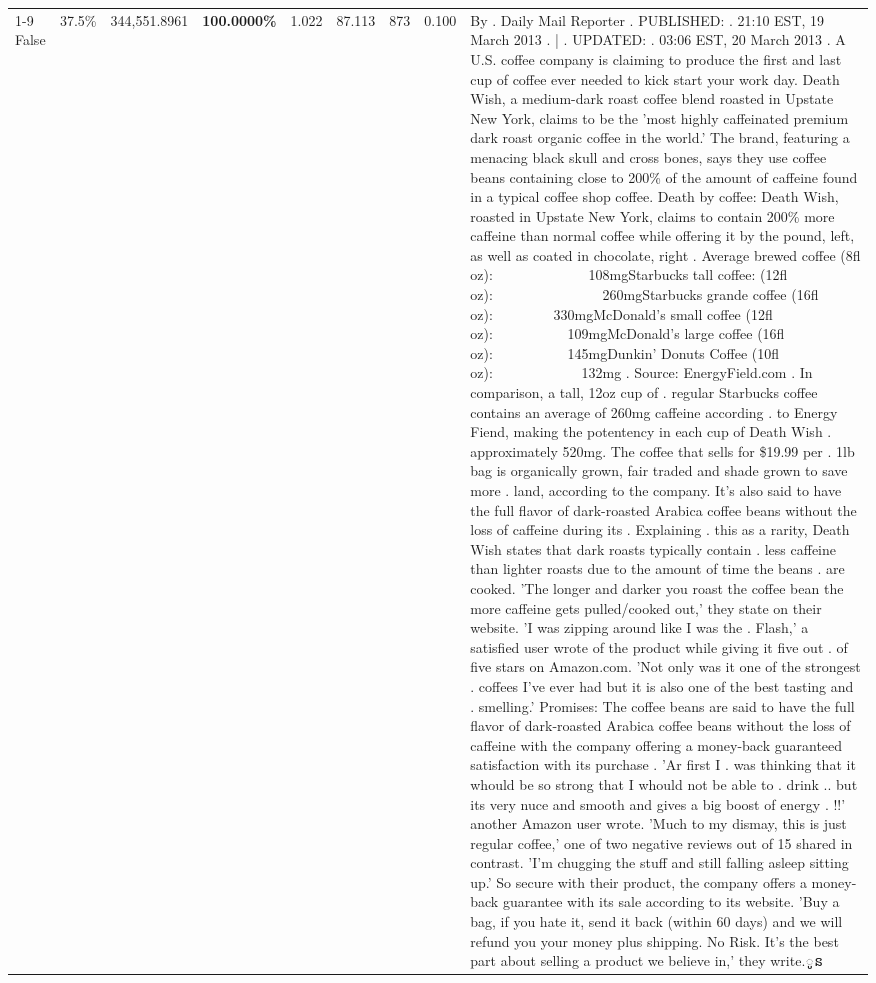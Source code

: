 \begin{table}[H]
{\begin{tabular}{lllrlllll}
\cline{1-9} \cline{2-9}
False & 37.5\% & 344,551.8961 & \bfseries \color{red} 100.0000\% & 1.022 & 87.113 & 873 & 0.100 & By . Daily Mail Reporter . PUBLISHED: . 21:10 EST, 19 March 2013 . | . UPDATED: . 03:06 EST, 20 March 2013 . A U.S. coffee company is claiming to produce the first and last cup of coffee ever needed to kick start your work day. Death Wish, a medium-dark roast coffee blend roasted in Upstate New York, claims to be the 'most highly caffeinated premium dark roast organic coffee in the world.' The brand, featuring a menacing black skull and cross bones, says they use coffee beans containing close to 200\% of the amount of caffeine found in a typical coffee shop coffee. Death by coffee: Death Wish, roasted in Upstate New York, claims to contain 200\% more caffeine than normal coffee while offering it by the pound, left, as well as coated in chocolate, right . Average brewed coffee (8fl oz):              108mgStarbucks tall coffee: (12fl oz):                260mgStarbucks grande coffee (16fl oz):         330mgMcDonald's small coffee (12fl oz):           109mgMcDonald's large coffee (16fl oz):           145mgDunkin' Donuts Coffee (10fl oz):             132mg . Source: EnergyField.com . In comparison, a tall, 12oz cup of . regular Starbucks coffee contains an average of 260mg caffeine according . to Energy Fiend, making the potentency in each cup of Death Wish . approximately 520mg. The coffee that sells for \$19.99 per . 1lb bag is organically grown, fair traded and shade grown to save more . land, according to the company. It's also said to have the full flavor of dark-roasted Arabica coffee beans without the loss of caffeine during its . Explaining . this as a rarity, Death Wish states that dark roasts typically contain . less caffeine than lighter roasts due to the amount of time the beans . are cooked. 'The longer and darker you roast the coffee bean the more caffeine gets pulled/cooked out,' they state on their website. 'I was zipping around like I was the . Flash,' a satisfied user wrote of the product while giving it five out . of five stars on Amazon.com. 'Not only was it one of the strongest . coffees I've ever had but it is also one of the best tasting and . smelling.’ Promises: The coffee beans are said to have the full flavor of dark-roasted Arabica coffee beans without the loss of caffeine with the company offering a money-back guaranteed satisfaction with its purchase . 'Ar first I . was thinking that it whould be so strong that I whould not be able to . drink .. but its very nuce and smooth and gives a big boost of energy . !!' another Amazon user wrote. 'Much to my dismay, this is just regular coffee,' one of two negative reviews out of 15 shared in contrast. 'I'm chugging the stuff and still falling asleep sitting up.' So secure with their product, the company offers a money-back guarantee with its sale according to its website. 'Buy a bag, if you hate it, send it back (within 60 days) and we will refund you your money plus shipping. No Risk. It’s the best part about selling a product we believe in,' they write.ូន \\

\end{tabular}}
\end{table}
